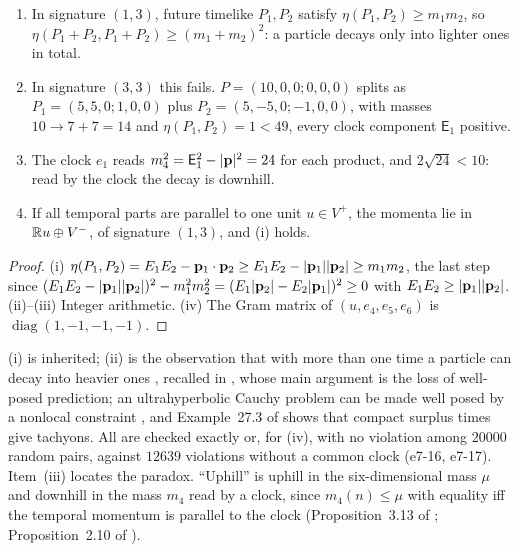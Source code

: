 \begin{proposition}
\label{e7:prop:uphill}
\begin{enumerate}[label=(\roman*),leftmargin=2.2em]
\item In signature $(1,3)$, future timelike $P_1,P_2$ satisfy $\eta(P_1,P_2)\ge m_1m_2$, so $\eta(P_1+P_2,P_1+P_2)\ge(m_1+m_2)^2$: a particle
decays only into lighter ones in total.
\item In signature $(3,3)$ this fails. $P=(10,0,0;0,0,0)$ splits as $P_1=(5,5,0;1,0,0)$ plus $P_2=(5,-5,0;-1,0,0)$, with masses
$10\to7+7=14$ and $\eta(P_1,P_2)=1<49$, every clock component $\mathsf E_1$ positive.
\item The clock $e_1$ reads $m_4^2=\mathsf E_1^2-|\mathbf p|^2=24$ for each product, and $2\sqrt{24}<10$: read by the clock the decay is downhill.
\item If all temporal parts are parallel to one unit $u\in V^+$, the momenta lie in $\mathbb{R} u\oplus V^-$, of signature $(1,3)$, and (i) holds.
\end{enumerate}
\end{proposition}

\begin{proof}
(i) $\eta(P_1,P_2)=E_1E_2-\mathbf p_1\cdot\mathbf p_2\ge E_1E_2-|\mathbf p_1||\mathbf p_2|\ge m_1m_2$, the last step since
$(E_1E_2-|\mathbf p_1||\mathbf p_2|)^2-m_1^2m_2^2=(E_1|\mathbf p_2|-E_2|\mathbf p_1|)^2\ge0$ with $E_1E_2\ge|\mathbf p_1||\mathbf p_2|$. (ii)--(iii) Integer arithmetic. (iv) The Gram
matrix of $(u,e_4,e_5,e_6)$ is $\operatorname{diag}(1,-1,-1,-1)$.
\end{proof}

(i) is inherited; (ii) is the observation that with more than one time a particle can decay into heavier ones \cite{Dorling70}, recalled in
\cite{Tegmark97}, whose main argument is the loss of well-posed prediction; an ultrahyperbolic Cauchy problem can be made well posed by a nonlocal
constraint \cite{CraigWeinstein09}, and Example~27.3 of \cite{ES17} shows that compact surplus times give tachyons. All are checked exactly or,
for (iv), with no violation among $20000$ random pairs, against $12639$ violations without a common clock (e7-16, e7-17). Item~(iii) locates the
paradox. ``Uphill'' is uphill in the six-dimensional mass $\mu$ and downhill in the mass $m_4$ read by a clock, since $m_4(n)\le\mu$ with equality iff
the temporal momentum is parallel to the clock (Proposition~3.13 of \cite{TR}; Proposition~2.10 of \cite{RE}).

